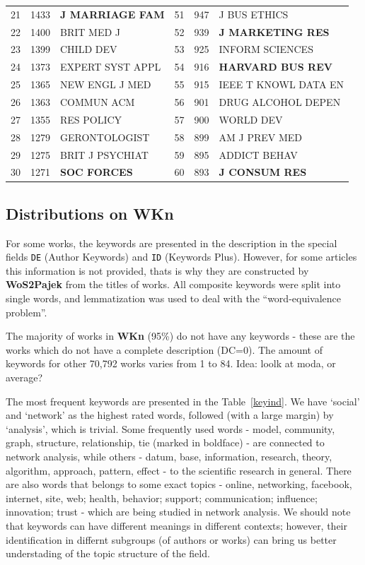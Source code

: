 \documentclass[11pt]{article} %
\begin{document}
\begin{table}
\begin{tabular}{c|r|l||c|r|l}
21&   	1433&   	\textbf{J MARRIAGE FAM}&   	51&   	947&   	J BUS ETHICS\\   
22&   	1400&   	BRIT MED J&   	52&   	939&   	\textbf{J MARKETING RES}\\   
23&   	1399&   	CHILD DEV&   	53&   	925&   	INFORM SCIENCES\\   
24&   	1373&   	EXPERT SYST APPL&   	54&   	916&   	\textbf{HARVARD BUS REV}\\   
25&   	1365&   	NEW ENGL J MED&   	55&   	915&   	IEEE T KNOWL DATA EN\\   
26&   	1363&   	COMMUN ACM&   	56&   	901&   	DRUG ALCOHOL DEPEN\\   
27&   	1355&   	RES POLICY&   	57&   	900&   	WORLD DEV\\   
28&   	1279&   	GERONTOLOGIST&   	58&   	899&   	AM J PREV MED\\   
29&   	1275&   	BRIT J PSYCHIAT&   	59&   	895&   	ADDICT BEHAV\\   
30&   	1271&   	\textbf{SOC FORCES}&   	60&   	893&   	\textbf{J CONSUM RES}\\  \hline
\end{tabular}

	

\end{table}

\subsection{Distributions on WKn}

For some works, the keywords are presented in the description in the special fields \texttt {DE} (Author Keywords) and \texttt {ID} (Keywords Plus). However, for some articles this information is not provided, thats is why they are constructed by \textbf{WoS2Pajek} from the titles of works. All composite keywords were split into single words, and lemmatization was used to deal with the ``word-equivalence problem''. \medskip

The majority of works in \textbf{WKn} (95\%) do not have any keywords - these are the works which do not have a complete description (DC=0). The amount of keywords for other 70,792 works varies from 1 to 84. Idea: loolk at moda, or average? \medskip
 
The most frequent keywords are presented in the Table~\ref{keyind}. We have `social' and `network' as the highest rated words, followed (with a large margin) by `analysis', which is trivial. Some frequently used words - model, community, graph, structure, relationship, tie (marked in boldface) - are connected to network analysis, while others - datum, base, information, research, theory, algorithm, approach, pattern, effect - to the scientific research in general. There are also words that belongs to some exact topics - online,  networking, facebook, internet, site, web; health, behavior; support; communication; influence; innovation; trust - which are being studied in network analysis. We should note that keywords can have different meanings in different contexts; however, their identification in differnt subgroups (of authors or works) can bring us better understading of the topic structure of the field. \medskip
\end{document}
